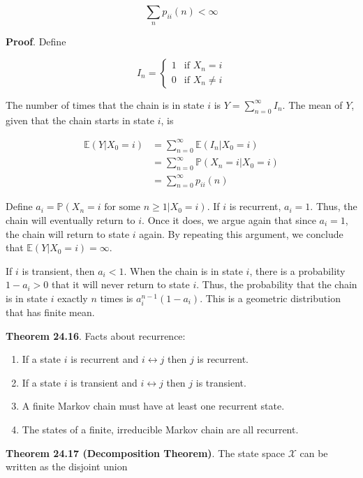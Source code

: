 \[ \sum_{n} p_{ii}(n) < \infty \]

\textbf{Proof}. Define

\[ 
I_{n} = \begin{cases}
1 & \text{if } X_{n} = i \\
0 & \text{if } X_{n} \neq i
\end{cases}
\]

The number of times that the chain is in state \(i\) is
\(Y = \sum_{n=0}^{\infty} I_{n}\). The mean of \(Y\), given that the chain
starts in state \(i\), is

\begin{align*}
\mathbb{E}(Y | X_{0} = i) &= \sum_{n=0}^{\infty} \mathbb{E}(I_{n} | X_{0} = i) \\
&= \sum_{n=0}^{\infty} \mathbb{P}(X_{n} = i | X_{0} = i) \\
&= \sum_{n=0}^{\infty} p_{ii}(n)
\end{align*}

Define
\(a_{i} = \mathbb{P}(X_{n} = i \text{ for some } n \geq 1 | X_{0} = i)\). If
\(i\) is recurrent, \(a_{i} = 1\). Thus, the chain will eventually return
to \(i\). Once it does, we argue again that since \(a_{i} = 1\), the chain
will return to state \(i\) again. By repeating this argument, we
conclude that \(\mathbb{E}(Y | X_{0} = i) = \infty\).

If \(i\) is transient, then \(a_{i} < 1\). When the chain is in state
\(i\), there is a probability \(1 - a_{i} > 0\) that it will never return
to state \(i\). Thus, the probability that the chain is in state \(i\)
exactly \(n\) times is \(a_{i}^{n - 1}(1 - a_{i})\). This is a geometric
distribution that has finite mean.

\textbf{Theorem 24.16}. Facts about recurrence:

\begin{enumerate}[tightlist,label={\arabic*.}]
\item
  If a state \(i\) is recurrent and \(i \leftrightarrow j\) then \(j\)
  is recurrent.
\item
  If a state \(i\) is transient and \(i \leftrightarrow j\) then \(j\)
  is transient.
\item
  A finite Markov chain must have at least one recurrent state.
\item
  The states of a finite, irreducible Markov chain are all recurrent.
\end{enumerate}

\textbf{Theorem 24.17 (Decomposition Theorem)}. The state space
\(\mathcal{X}\) can be written as the disjoint union

